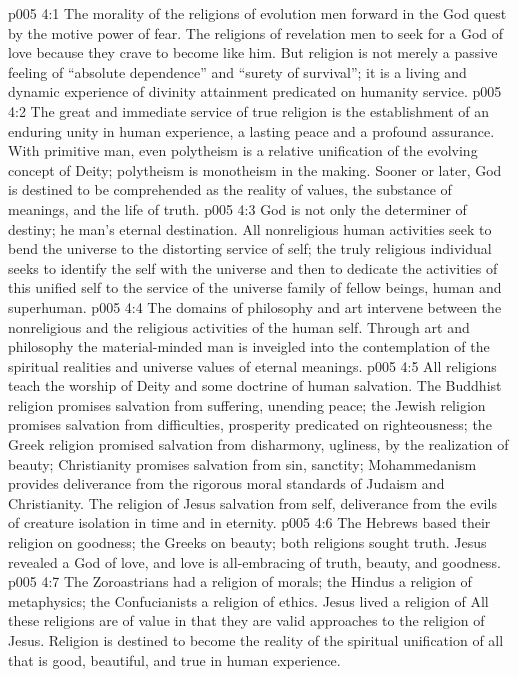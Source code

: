 \vs p005 4:1 The morality of the religions of evolution  men forward in the God quest by the motive power of fear. The religions of revelation  men to seek for a God of love because they crave to become like him. But religion is not merely a passive feeling of “absolute dependence” and “surety of survival”; it is a living and dynamic experience of divinity attainment predicated on humanity service.
\vs p005 4:2 The great and immediate service of true religion is the establishment of an enduring unity in human experience, a lasting peace and a profound assurance. With primitive man, even polytheism is a relative unification of the evolving concept of Deity; polytheism is monotheism in the making. Sooner or later, God is destined to be comprehended as the reality of values, the substance of meanings, and the life of truth.
\vs p005 4:3 God is not only the determiner of destiny; he  man’s eternal destination. All nonreligious human activities seek to bend the universe to the distorting service of self; the truly religious individual seeks to identify the self with the universe and then to dedicate the activities of this unified self to the service of the universe family of fellow beings, human and superhuman.
\pc \vs p005 4:4 The domains of philosophy and art intervene between the nonreligious and the religious activities of the human self. Through art and philosophy the material\hyp{}minded man is inveigled into the contemplation of the spiritual realities and universe values of eternal meanings.
\pc \vs p005 4:5 All religions teach the worship of Deity and some doctrine of human salvation. The Buddhist religion promises salvation from suffering, unending peace; the Jewish religion promises salvation from difficulties, prosperity predicated on righteousness; the Greek religion promised salvation from disharmony, ugliness, by the realization of beauty; Christianity promises salvation from sin, sanctity; Mohammedanism provides deliverance from the rigorous moral standards of Judaism and Christianity. The religion of Jesus  salvation from self, deliverance from the evils of creature isolation in time and in eternity.
\vs p005 4:6 The Hebrews based their religion on goodness; the Greeks on beauty; both religions sought truth. Jesus revealed a God of love, and love is all\hyp{}embracing of truth, beauty, and goodness.
\vs p005 4:7 The Zoroastrians had a religion of morals; the Hindus a religion of metaphysics; the Confucianists a religion of ethics. Jesus lived a religion of  All these religions are of value in that they are valid approaches to the religion of Jesus. Religion is destined to become the reality of the spiritual unification of all that is good, beautiful, and true in human experience.
